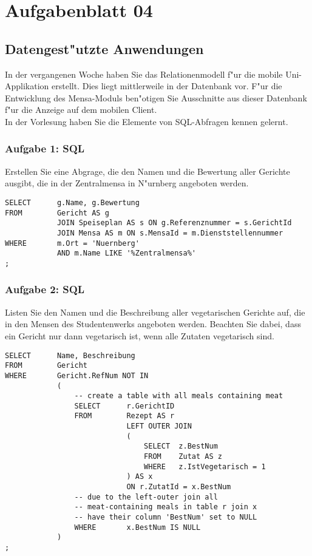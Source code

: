 

\chapter{Aufgabenblatt 04}

\section{Datengest"utzte Anwendungen}
In der vergangenen Woche haben Sie das Relationenmodell f"ur die mobile Uni-Applikation erstellt.
Dies liegt mittlerweile in der Datenbank vor.
F"ur die Entwicklung des Mensa-Moduls ben"otigen Sie Ausschnitte aus dieser Datenbank f"ur die Anzeige auf dem mobilen Client.\\
In der Vorlesung haben Sie die Elemente von SQL-Abfragen kennen gelernt.


\subsection{Aufgabe 1: SQL}
Erstellen Sie eine Abgrage, die den Namen und die Bewertung aller Gerichte ausgibt, die in der Zentralmensa in N"urnberg angeboten werden.

\lstset{style=customSQL}
\begin{lstlisting}
SELECT      g.Name, g.Bewertung
FROM        Gericht AS g
            JOIN Speiseplan AS s ON g.Referenznummer = s.GerichtId
            JOIN Mensa AS m ON s.MensaId = m.Dienststellennummer
WHERE       m.Ort = 'Nuernberg'
            AND m.Name LIKE '%Zentralmensa%'
;
\end{lstlisting}

\subsection{Aufgabe 2: SQL}
Listen Sie den Namen und die Beschreibung aller vegetarischen Gerichte auf, die in den Mensen des Studentenwerks angeboten werden.
Beachten Sie dabei, dass ein Gericht nur dann vegetarisch ist, wenn alle Zutaten vegetarisch sind.\\

\lstset{style=customSQL}
\begin{lstlisting}
SELECT      Name, Beschreibung
FROM        Gericht
WHERE       Gericht.RefNum NOT IN
            (
                -- create a table with all meals containing meat
                SELECT      r.GerichtID
                FROM        Rezept AS r
                            LEFT OUTER JOIN 
                            (
                                SELECT  z.BestNum
                                FROM    Zutat AS z
                                WHERE   z.IstVegetarisch = 1
                            ) AS x
                            ON r.ZutatId = x.BestNum
                -- due to the left-outer join all 
                -- meat-containing meals in table r join x
                -- have their column 'BestNum' set to NULL
                WHERE       x.BestNum IS NULL
            )
;
\end{lstlisting}



